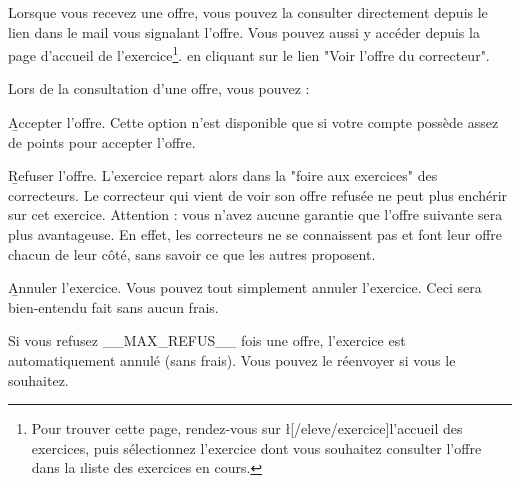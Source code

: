 ﻿Lorsque vous recevez une offre, vous pouvez la consulter directement depuis le lien dans le mail vous signalant l'offre. Vous pouvez aussi y accéder depuis la page d'accueil de l'exercice\footnote{Pour trouver cette page, rendez-vous sur \l[/eleve/exercice]{l'accueil des exercices}, puis sélectionnez l'exercice dont vous souhaitez consulter l'offre dans la \i{liste des exercices en cours}.}. en cliquant sur le lien "Voir l'offre du correcteur".

Lors de la consultation d'une offre, vous pouvez :
\item \b{Accepter l'offre}. Cette option n'est disponible que si votre compte possède assez de points pour accepter l'offre.
\item \b{Refuser l'offre}. L'exercice repart alors dans la "foire aux exercices" des correcteurs. Le correcteur qui vient de voir son offre refusée ne peut plus enchérir sur cet exercice. Attention : vous n'avez aucune garantie que l'offre suivante sera plus avantageuse. En effet, les correcteurs ne se connaissent pas et font leur offre chacun de leur côté, sans savoir ce que les autres proposent.
\item \b{Annuler l'exercice}. Vous pouvez tout simplement annuler l'exercice. Ceci sera bien-entendu fait sans aucun frais.

Si vous refusez __MAX_REFUS__ fois une offre, l'exercice est automatiquement annulé (sans frais). Vous pouvez le réenvoyer si vous le souhaitez.